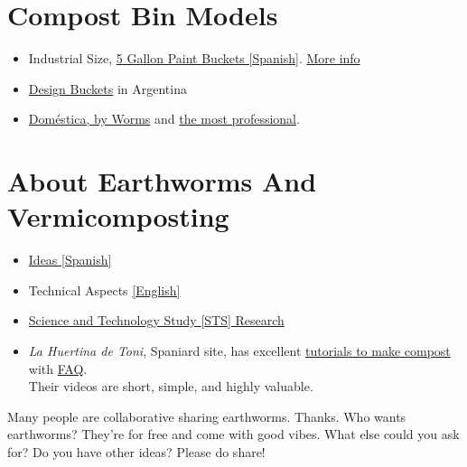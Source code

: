 \documentclass[10pt, a4paper,nodate]{article} %
\begin{document}
\section*{Compost Bin Models}
\begin{itemize}
\tightlist
\item
  Industrial Size, 
  \href{../docs/tachos.pdf}{\color{black} 5 Gallon Paint Buckets [Spanish]}.
  \href{http://www.corraldebustos.gov.ar/municipalidad.asp?id=183}{\color{black} More info}{}
\item
  \href{https://www.micompas.com/}{\color{black} Design Buckets} in Argentina 
\item
  \href{https://wormsargentina.com/producto/reciclador-domestico/}{\color{black} Doméstica,
  by Worms} and
  \href{https://wormsargentina.com/producto/worms-smart/}{\color{black} the most
  professional}.
\end{itemize}
%
 \section*{About Earthworms And Vermicomposting}
\begin{itemize}
\tightlist
\item
  \href{http://ramoneando.com/citas/gabetta-jose.html}{\color{black} Ideas {[}Spanish{]}}
\item
  Technical Aspects
  \href{http://ir.library.oregonstate.edu/xmlui/bitstream/handle/1957/23949/em9034.pdf}{{\color{black} [English]}}
\item
  \href{https://www.environmentandsociety.org/mml/compost-politics-experimenting-togetherness-vermicomposting}{\color{black} Science
  and Technology Study {[}STS{]} Research}
\item
\texorpdfstring{\emph{La Huertina de Toni}, Spaniard site,
has excellent
\href{http://www.lahuertinadetoni.es/como-hacer-humus-de-lombriz/}{\color{black} tutorials
to make compost} with
\href{http://www.lahuertinadetoni.es/lombrices-dudas-mas-frecuentes/}{\color{black} FAQ}.\\
Their videos are short, simple, and highly
valuable.}{La Huertina de Toni, Spaniard site, has excellent tutorials to make compost with FAQ. Their videos are short, simple, and highly valuable.}

\end{itemize}
%

Many people are collaborative sharing earthworms. Thanks. Who wants
earthworms? They're for free and come with good vibes. What else could
you ask for?
Do you have other ideas? Please do share!

\end{document}
